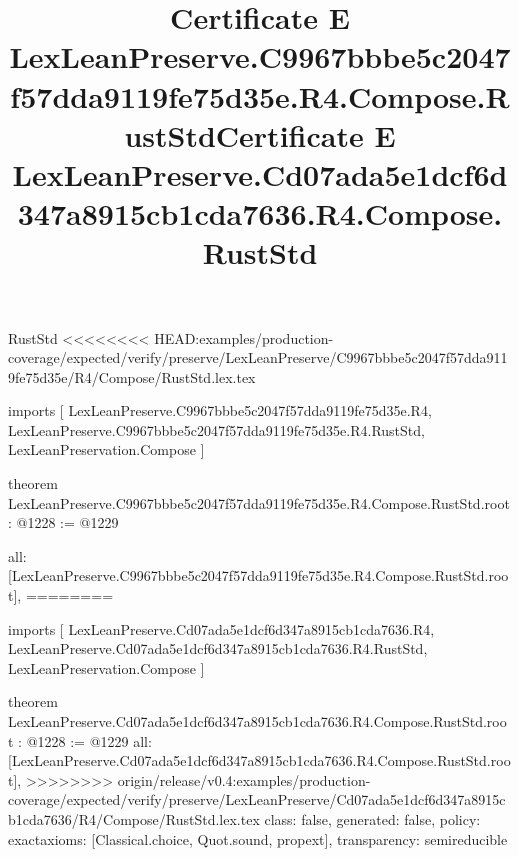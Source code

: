 \begin{lexlean}{RustStd}
<<<<<<<< HEAD:examples/production-coverage/expected/verify/preserve/LexLeanPreserve/C9967bbbe5c2047f57dda9119fe75d35e/R4/Compose/RustStd.lex.tex
\title{Certificate E LexLeanPreserve.C9967bbbe5c2047f57dda9119fe75d35e.R4.Compose.RustStd}
\begin{coremodule}
imports [
  LexLeanPreserve.C9967bbbe5c2047f57dda9119fe75d35e.R4,
  LexLeanPreserve.C9967bbbe5c2047f57dda9119fe75d35e.R4.RustStd,
  LexLeanPreservation.Compose
]

theorem LexLeanPreserve.C9967bbbe5c2047f57dda9119fe75d35e.R4.Compose.RustStd.root : @1228 := @1229 {
  all: [LexLeanPreserve.C9967bbbe5c2047f57dda9119fe75d35e.R4.Compose.RustStd.root],
========
\title{Certificate E LexLeanPreserve.Cd07ada5e1dcf6d347a8915cb1cda7636.R4.Compose.RustStd}
\begin{coremodule}
imports [
  LexLeanPreserve.Cd07ada5e1dcf6d347a8915cb1cda7636.R4,
  LexLeanPreserve.Cd07ada5e1dcf6d347a8915cb1cda7636.R4.RustStd,
  LexLeanPreservation.Compose
]

theorem LexLeanPreserve.Cd07ada5e1dcf6d347a8915cb1cda7636.R4.Compose.RustStd.root : @1228 := @1229 {
  all: [LexLeanPreserve.Cd07ada5e1dcf6d347a8915cb1cda7636.R4.Compose.RustStd.root],
>>>>>>>> origin/release/v0.4:examples/production-coverage/expected/verify/preserve/LexLeanPreserve/Cd07ada5e1dcf6d347a8915cb1cda7636/R4/Compose/RustStd.lex.tex
  class: false,
  generated: false,
  policy: exact{axioms: [Classical.choice, Quot.sound, propext]},
  transparency: semireducible
}


\end{coremodule}}
\end{coremodule}
\end{lexlean}

